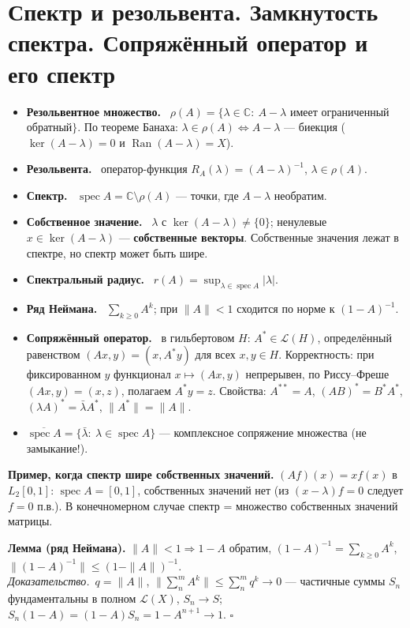 \documentclass[11pt,a4paper]{article}
\newcommand{\Lc}{\mathcal L}
\newcommand{\CC}{\mathbb C}
\newcommand{\spec}{\operatorname{spec}}
\newcommand{\Ran}{\operatorname{Ran}}
\newcommand{\df}[1]{\textbf{#1.}~}
\newcommand{\pf}{\textit{Доказательство.}~}
\newcommand{\qedd}{\hfill$\square$}
\begin{document}
\section{Спектр и резольвента. Замкнутость спектра. Сопряжённый оператор и его спектр}
\begin{defs}
\begin{itemize}
\item \df{Резольвентное множество} $\rho(A)=\{\lambda\in\CC:\ A-\lambda$ имеет ограниченный обратный$\}$. По теореме Банаха: $\lambda\in\rho(A)\iff A-\lambda$ — биекция ($\ker(A-\lambda)=0$ и $\Ran(A-\lambda)=X$).
\item \df{Резольвента} оператор-функция $R_A(\lambda)=(A-\lambda)^{-1}$, $\lambda\in\rho(A)$.
\item \df{Спектр} $\spec A=\CC\setminus\rho(A)$ — точки, где $A-\lambda$ необратим.
\item \df{Собственное значение} $\lambda$ с $\ker(A-\lambda)\ne\{0\}$; ненулевые $x\in\ker(A-\lambda)$ — \textbf{собственные векторы}. Собственные значения лежат в спектре, но спектр может быть шире.
\item \df{Спектральный радиус} $r(A)=\sup_{\lambda\in\spec A}|\lambda|$.
\item \df{Ряд Неймана} $\sum_{k\ge0}A^k$; при $\|A\|<1$ сходится по норме к $(1-A)^{-1}$.
\item \df{Сопряжённый оператор} в гильбертовом $H$: $A^*\in\Lc(H)$, определённый равенством $(Ax,y)=(x,A^*y)$ для всех $x,y\in H$. Корректность: при фиксированном $y$ функционал $x\mapsto(Ax,y)$ непрерывен, по Риссу–Фреше $(Ax,y)=(x,z)$, полагаем $A^*y=z$. Свойства: $A^{**}=A$, $(AB)^*=B^*A^*$, $(\lambda A)^*=\bar\lambda A^*$, $\|A^*\|=\|A\|$.
\item $\overline{\spec A}=\{\bar\lambda:\ \lambda\in\spec A\}$ — комплексное сопряжение множества (не замыкание!).
\end{itemize}
\textbf{Пример, когда спектр шире собственных значений.} $(Af)(x)=xf(x)$ в $L_2[0,1]$: $\spec A=[0,1]$, собственных значений нет (из $(x-\lambda)f=0$ следует $f=0$ п.в.). В конечномерном случае спектр = множество собственных значений матрицы.
\end{defs}

\textbf{Лемма (ряд Неймана).} $\|A\|<1\Rightarrow 1-A$ обратим, $(1-A)^{-1}=\sum_{k\ge0}A^k$, $\|(1-A)^{-1}\|\le(1-\|A\|)^{-1}$.\\
\pf $q=\|A\|$, $\|\sum_n^mA^k\|\le\sum_n^mq^k\to0$ — частичные суммы $S_n$ фундаментальны в полном $\Lc(X)$, $S_n\to S$; $S_n(1-A)=(1-A)S_n=1-A^{n+1}\to1$. \qedd
\end{document}
